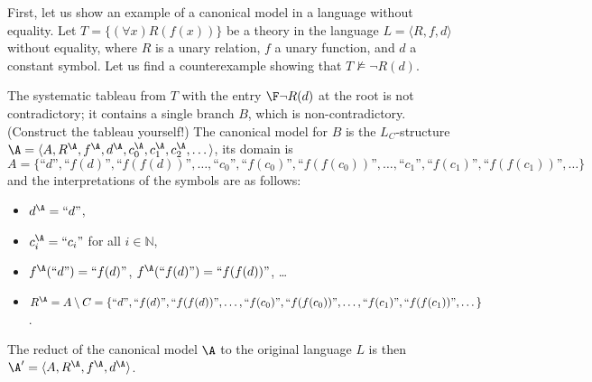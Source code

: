 \begin{example}
    First, let us show an example of a canonical model in a language without equality. Let $T=\{(\forall x)R(f(x))\}$ be a theory in the language $L=\langle R,f,d \rangle$ without equality, where $R$ is a unary relation, $f$ a unary function, and $d$ a constant symbol. Let us find a counterexample showing that $T\not\models\neg R(d)$. 
    
    The systematic tableau from $T$ with the entry $\F\neg R(d)$ at the root is not contradictory; it contains a single branch $B$, which is non-contradictory. (Construct the tableau yourself!) The canonical model for $B$ is the $L_C$-structure $\A=\langle A,R^\A,f^\A,d^\A,c_0^\A,c_1^\A,c_2^\A,\dots\rangle$, its domain is
    $$
    A=\{\text{``$d$''},\text{``$f(d)$''},\text{``$f(f(d))$''},\dots,\text{``$c_0$''},\text{``$f(c_0)$''},\text{``$f(f(c_0))$''},\dots,\text{``$c_1$''},\text{``$f(c_1)$''},\text{``$f(f(c_1))$''},\dots\}
    $$
    and the interpretations of the symbols are as follows:
    \begin{itemize}
        \item $d^\A=\text{``$d$''}$,
        \item $c^\A_i=\text{``$c_i$''}$ for all $i\in \mathbb N$,
        \item $f^\A(\text{``$d$''})=\text{``$f(d)$''}$, $f^\A(\text{``$f(d)$''})=\text{``$f(f(d))$''}$, \dots
        \item $R^\A=A\setminus C=\{\text{``$d$''},\text{``$f(d)$''},\text{``$f(f(d))$''},\dots,\text{``$f(c_0)$''},\text{``$f(f(c_0))$''},\dots,\text{``$f(c_1)$''},\text{``$f(f(c_1))$''},\dots\}$.
    \end{itemize}
    The reduct of the canonical model $\A$ to the original language $L$ is then $\A'=\langle A, R^\A, f^\A, d^\A\rangle$.
\end{example}

